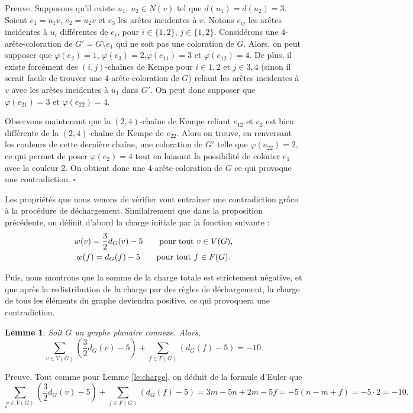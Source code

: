 \documentclass[10pt,a4paper]{article}
\newtheorem{lemme}{Lemme}
\newcommand{\ep}{{\hfill $\square$}}
\begin{document}
Preuve.
Supposons qu'il existe $u_1$, $u_2 \in N(v)$ tel que $d(u_1) = d(u_2) = 3$. Soient $e_1 = u_1v$, $e_2 = u_2v$ et $e_3$ les arêtes incidentes à $v$. Notons $e_{ij}$ les arêtes incidentes à $u_i$ différentes de $e_i$, pour $i \in \{1,2\}$, $j \in \{1,2\}$. Considérons une $4$-arête-coloration de $G' = G \setminus e_1$ qui ne soit pas une coloration de $G$. Alors, on peut supposer que  $\varphi(e_2)=1$, $\varphi(e_3)=2$,$\varphi(e_{11})=3$ et $\varphi(e_{12})=4$. De plus, il existe forcément des $(i,j)$-chaînes de Kempe pour $i \in {1,2}$ et $j \in {3,4}$ (sinon il serait facile de trouver une $4$-arête-coloration de $G$) reliant les arêtes incidentes à $v$ avec les arêtes incidentes à $u_1$ dans $G'$. On peut donc supposer que $\varphi(e_{21})=3$ et $\varphi(e_{22})=4$.

Observons maintenant que la $(2,4)$-chaîne de Kempe reliant $e_{12}$ et $e_2$ est bien différente de la $(2,4)$-chaîne de Kempe de $e_{22}$. Alors on trouve, en renversant les couleurs de cette dernière chaîne, une coloration de $G'$ telle que $\varphi(e_{22}) = 2$, ce qui permet de poser $\varphi(e_2) = 4$ tout en laissant la possibilité de colorier $e_1$ avec la couleur 2. On obtient donc une $4$-arête-coloration de $G$ ce qui provoque une contradiction.
\ep


Les propriétés que nous venons de vérifier vont entraîner une contradiction grâce à la procédure de déchargement. Similairement que dans la proposition précédente, on définit d'abord la charge initiale par la fonction suivante :
$$
\gathered
w(v) = \frac{3}{2} d_G(v) - 5 \qquad \textrm{pour tout $v\in V(G)$,} \\
w(f) = d_G(f) - 5 \qquad \textrm{pour tout $f\in F(G)$.}
\endgathered
$$

Puis, nous montrons que la somme de la charge totale est strictement négative, et que après la redistribution de la charge par des règles de déchargement, la charge de tous les éléments du graphe deviendra positive, ce qui provoquera une contradiction.


\begin{lemme}
Soit $G$ un graphe planaire connexe. Alors,
$$
\sum_{v \in V(G)} \left(\frac{3}{2} d_G(v) - 5\right) + \sum_{f\in F(G)} \left(d_G(f) -5\right) = -10.
$$
\label{le:cha2}
\end{lemme}

Preuve.
Tout comme pour Lemme \ref{le:charge}, on déduit de la formule d'Euler que
$$ 
\sum_{v \in V(G)} \left(\frac{3}{2}d_G(v) - 5\right) + \sum_{f\in F(G)} \left(d_G(f) -5\right) = 3m -5n + 2m - 5f = -5(n - m + f) = -5 \cdot 2 = -10.
$$
\ep 
\end{document}
